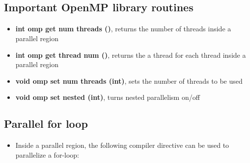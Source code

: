 \documentclass[%
oneside,                 %
final,                   %
10pt]{article}
\begin{document}
\subsection*{Important OpenMP library routines}

\paragraph{}

\begin{itemize}
\item \textbf{int omp get num threads ()}, returns the number of threads inside a parallel region

\item \textbf{int omp get thread num ()},  returns the  a thread for each thread inside a parallel region

\item \textbf{void omp set num threads (int)}, sets the number of threads to be used

\item \textbf{void omp set nested (int)},  turns nested parallelism on/off
\end{itemize}

\noindent



\subsection*{Parallel for loop}

\paragraph{}
\begin{itemize}
 \item Inside a parallel region, the following compiler directive can be used to parallelize a for-loop:
\end{itemize}
\end{document}
